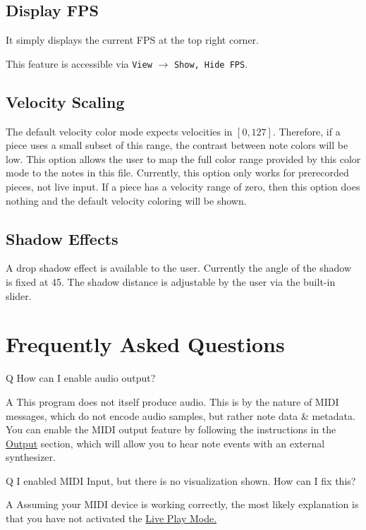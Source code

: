 \documentclass[english]{article}
\newcommand\faqQ[1]{%
  \leavevmode\par
  \noindent
{\hspace{4pt}\Large Q} \raisebox{0.1em}{\textendash{}} {\large #1}\par \vspace{-0.5em}}
\newcommand\faqA[2][]{%
  \leavevmode\par\noindent
  {\leftskip30pt
  {\large A} \raisebox{0.05em}{\textendash{}} \textbf{#1}#2\par \vspace{-0.25em}}}
\providecommand{\mi}[1]{\texttt{#1}}
\begin{document}
\vspace{1em}

\subsection{Display FPS}

It simply displays the current FPS at the top right corner.

This feature is accessible via 
\mi{View} $\rightarrow$ \mi{{Show, Hide} FPS}.

\subsection{Velocity Scaling}

The default velocity color mode expects velocities in $[0, 127]$. Therefore, if a piece uses a small subset of this range,
the contrast between note colors will be low. This option allows the user to map the full color range provided by this
color mode to the notes in this file. Currently, this option only works for prerecorded pieces, not live input.
If a piece has a velocity range of zero, then this option does nothing and the default velocity coloring will
be shown.

\subsection{Shadow Effects}

A drop shadow effect is available to the user. Currently the angle of the shadow is fixed at 45\textdegree. The shadow
distance is adjustable by the user via the built-in slider.

\section{Frequently Asked Questions}

\faqQ{How can I enable audio output?}

\faqA{This program does not itself produce audio. This is by the nature of MIDI messages, which do not encode audio samples,
but rather note data \& metadata. You can enable the MIDI output feature by following the instructions in the 
\textcolor{lcol}{\hyperref[subsec:output]{Output}} section, which will allow you to hear note events with an external
synthesizer.}

\faqQ{I enabled MIDI Input, but there is no visualization shown. How can I fix this?}

\faqA{Assuming your MIDI device is working correctly, the most likely explanation is that you have not activated the
\textcolor{lcol}{\hyperref[subsec:liveplay]{Live Play Mode.}}}
\end{document}
